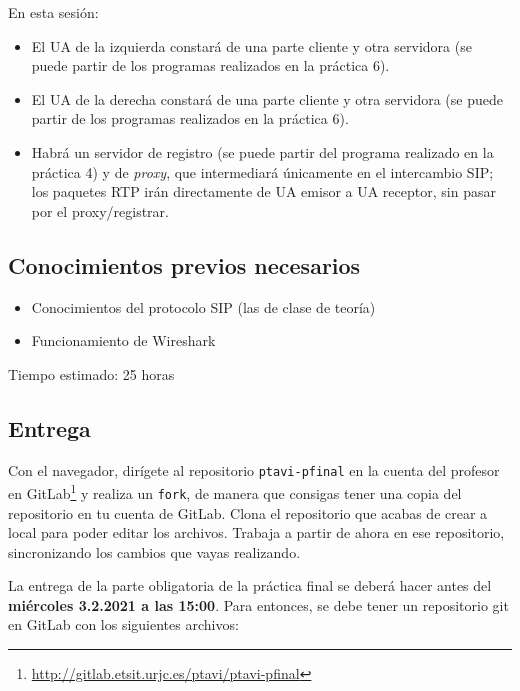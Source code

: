 \documentclass[a4paper,11pt]{article}
\begin{document}
En esta sesión:

\begin{itemize}
  \item El UA de la izquierda constará de una parte cliente y otra servidora (se puede partir de los programas realizados en la práctica 6).
  \item El UA de la derecha constará de una parte cliente y otra servidora (se puede partir de los programas realizados en la práctica 6).
  \item Habrá un servidor de registro (se puede partir del programa realizado en la práctica 4) y de \emph{proxy}, que intermediará únicamente en el intercambio SIP; los paquetes RTP irán directamente de UA emisor a UA receptor, sin pasar por el proxy/registrar.
\end{itemize}


\subsection{Conocimientos previos necesarios}

\begin{itemize}
  \item Conocimientos del protocolo SIP (las de clase de teoría)
  \item Funcionamiento de Wireshark
\end{itemize}

Tiempo estimado: 25 horas


\subsection{Entrega}

Con el navegador, dirígete al repositorio \texttt{ptavi-pfinal} en la cuenta del profesor en GitLab\footnote{\url{http://gitlab.etsit.urjc.es/ptavi/ptavi-pfinal}} y realiza un \texttt{fork}, de manera que consigas tener una copia del repositorio en tu cuenta de GitLab. Clona el repositorio que acabas de crear a local para poder editar los archivos. Trabaja a partir de ahora en ese repositorio, sincronizando los cambios que vayas realizando.

La entrega de la parte obligatoria de la práctica final se deberá hacer antes del {\bf miércoles 3.2.2021 a las 15:00}. Para entonces, se debe tener un repositorio git en GitLab con los siguientes archivos:
\end{document}
